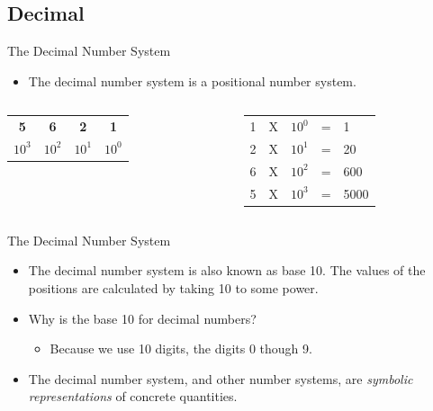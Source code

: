 \documentclass[graphics]{beamer}
\newcommand*{\thead}[1]{\multicolumn{1}{c}{\bfseries #1}}
\begin{document}
\subsection{Decimal}
\begin{frame}{The Decimal Number System}
    \begin{itemize}
        \item The decimal number system is a positional number system.
    \end{itemize}
    
    \begin{columns}
            \begin{tabular}{ c c c c }
                \thead{5} & \thead{6} & \thead{2} & \thead{1} \\ 
                $10^3$ & $10^2$ & $10^1$ & $10^0$
            \end{tabular}
            \begin{tabular}{ l l l l l }
                1 & X & $10^0$ & = & 1 \\ 
                2 & X & $10^1$ & = & 20 \\
                6 & X & $10^2$ & = & 600 \\
                5 & X & $10^3$ & = & 5000
            \end{tabular}
    \end{columns}
\end{frame}

\begin{frame}{The Decimal Number System}
    \begin{itemize}
        \item The decimal number system is also known as base 10. The values of the positions are calculated by taking 10 to some power.
        \item Why is the base 10 for decimal numbers?
        \begin{itemize}
            \item Because we use 10 digits, the digits 0 though 9.
        \end{itemize}
        \item The decimal number system, and other number systems, are \textit{symbolic representations} of concrete quantities.
    \end{itemize}
\end{frame}
\end{document}
